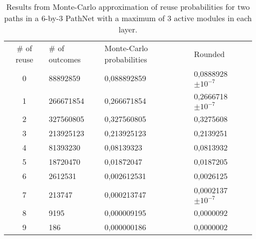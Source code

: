 \begin{table}[ht]
    \centering
    \begin{tabular}{clll}
    \# of reuse & \# of outcomes & Monte-Carlo probabilities & Rounded  \\
    0           & 88892859      & 0,088892859               & 0,0888928 \(\pm 10^{-7}\)  \\
    1           & 266671854     & 0,266671854               & 0,2666718 \(\pm 10^{-7}\)  \\
    2           & 327560805     & 0,327560805               & 0,3275608                  \\
    3           & 213925123     & 0,213925123               & 0,2139251                  \\
    4           & 81393230      & 0,08139323                & 0,0813932                  \\
    5           & 18720470      & 0,01872047                & 0,0187205                  \\
    6           & 2612531       & 0,002612531               & 0,0026125                  \\
    7           & 213747        & 0,000213747               & 0,0002137 \(\pm 10^{-7}\)  \\
    8           & 9195          & 0,000009195               & 0,0000092                  \\
    9           & 186           & 0,000000186               & 0,0000002                 
    \end{tabular}
    \caption{Results from Monte-Carlo approximation of reuse probabilities for two paths in a 6-by-3 PathNet with a maximum of 3 active modules in each layer.}
    \label{tab:montecarlo}
\end{table}
